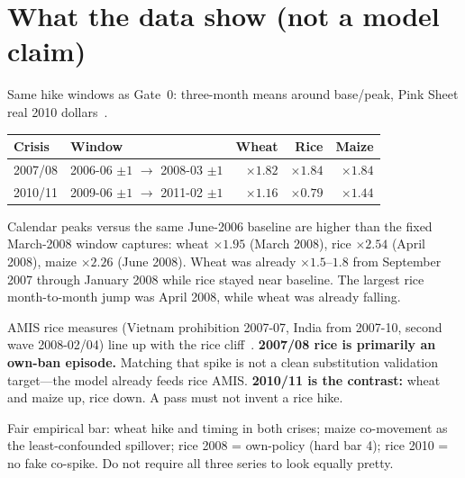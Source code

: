 \section{What the data show (not a model claim)}
\label{sec:data}

Same hike windows as Gate~0: three-month means around base/peak, Pink
Sheet real 2010 dollars~\citep{worldbank_pink}.

\begin{center}
\begin{tabular}{l l rrr}
\toprule
Crisis & Window & Wheat & Rice & Maize \\
\midrule
2007/08 & 2006-06 \(\pm 1\) \(\to\) 2008-03 \(\pm 1\)
  & \(\times 1.82\) & \(\times 1.84\) & \(\times 1.84\) \\
2010/11 & 2009-06 \(\pm 1\) \(\to\) 2011-02 \(\pm 1\)
  & \(\times 1.16\) & \(\times 0.79\) & \(\times 1.44\) \\
\bottomrule
\end{tabular}
\end{center}

Calendar peaks versus the same June-2006 baseline are higher than the
fixed March-2008 window captures: wheat \(\times 1.95\) (March 2008), rice
\(\times 2.54\) (April 2008), maize \(\times 2.26\) (June 2008). Wheat was
already \(\times 1.5\)--\(1.8\) from September 2007 through January 2008
while rice stayed near baseline. The largest rice month-to-month jump was
April 2008, while wheat was already falling.

AMIS rice measures (Vietnam prohibition 2007-07, India from 2007-10,
second wave 2008-02/04) line up with the rice cliff~\citep{amis_oecd}.
\textbf{2007/08 rice is primarily an own-ban episode.} Matching that spike
is not a clean substitution validation target---the model already feeds
rice AMIS. \textbf{2010/11 is the contrast:} wheat and maize up, rice
down. A pass must not invent a rice hike.

Fair empirical bar: wheat hike and timing in both crises; maize
co-movement as the least-confounded spillover; rice 2008 = own-policy
(hard bar 4); rice 2010 = no fake co-spike. Do not require all three
series to look equally pretty.
